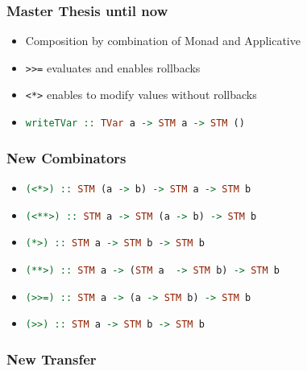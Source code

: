 \documentclass{beamer}
\begin{document}
  \begin{frame}
   \frametitle{Master Thesis until now}
   \begin{itemize}\setlength\itemsep{1em}
    \item Composition by combination of Monad and Applicative
    \item\lstinline{>>=} evaluates and enables rollbacks
    \item\lstinline{<*>} enables to modify values without rollbacks
    \item \lstinline[language=Haskell]{writeTVar :: TVar a -> STM a -> STM ()} 
   \end{itemize}
  \end{frame}


  
  \begin{frame}
   \frametitle{New Combinators}
   \begin{itemize}\setlength\itemsep{1em}
    \item \lstinline[language=Haskell]{(<*>) :: STM (a -> b) -> STM a -> STM b}
    \item \lstinline[language=Haskell]{(<**>) :: STM a -> STM (a -> b) -> STM b}
    \item \lstinline[language=Haskell]{(*>) :: STM a -> STM b -> STM b}
    \item \lstinline[language=Haskell]{(**>) :: STM a -> (STM a  -> STM b) -> STM b}
    \item \lstinline[language=Haskell]{(>>=) :: STM a -> (a -> STM b) -> STM b}
    \item \lstinline[language=Haskell]{(>>) :: STM a -> STM b -> STM b}
   \end{itemize}
  \end{frame}

  
  \begin{frame}[fragile]
    \frametitle{New Transfer}
    
\end{frame}
  
\end{document}
